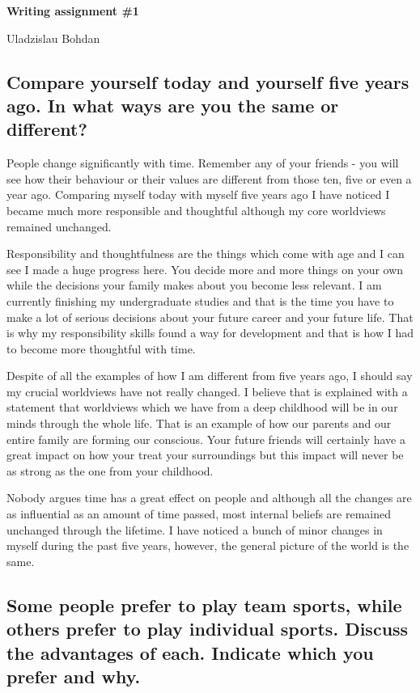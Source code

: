 \documentclass{article}
\begin{document}
{\Large

\textbf{Writing assignment \#1}

Uladzislau Bohdan

}

\vspace{10mm}

\subsection*{Compare yourself today and yourself five years ago. In what ways
are you the same or different?}

People change significantly with time. Remember any of your friends - you will
see how their behaviour or their values are different from those ten, five or
even a year ago. Comparing myself today with myself five years ago I have
noticed I became much more responsible and thoughtful although my core
worldviews remained unchanged.

Responsibility and thoughtfulness are the things which come with age and I can
see I made a huge progress here. You decide more and more things on
your own while the decisions your family makes about you become less relevant.
I am currently finishing my undergraduate studies and that is the time you
have to make a lot of serious decisions about your future career and your future
life. That is why my responsibility skills found a way for development and
that is how I had to become more thoughtful with time.

Despite of all the examples of how I am different from five years ago, I should
say my crucial worldviews have not really changed. I believe that is explained
with a statement that worldviews which we have from a deep childhood
will be in our minds through the whole life. That is an example of how our
parents and our entire family are forming our conscious. Your future friends
will certainly have a great impact on how your treat your surroundings but
this impact will never be as strong as the one from your childhood.

Nobody argues time has a great effect on people and although all the changes
are as influential as an amount of time passed, most internal beliefs are remained
unchanged through the lifetime. I have noticed a bunch of minor changes in myself
during the past five years, however, the general picture of the world is the same.

\subsection*{Some people prefer to play team sports, while others prefer to play
individual sports. Discuss the advantages of each. Indicate which you prefer
and why.}
\end{document}

